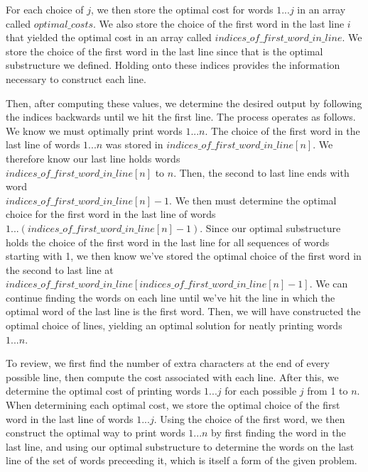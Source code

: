 \documentclass[11pt]{article}
\begin{document}
For each choice of $j$, we then store the optimal cost for words $1...j$ in an array called $optimal\_costs$. We also store the choice of the first word in the last line $i$ that yielded the optimal cost in an array called $indices\_of\_first\_word\_in\_line$. We store the choice of the first word in the last line since that is the optimal substructure we defined. Holding onto these indices provides the information necessary to construct each line.

Then, after computing these values, we determine the desired output by following the indices backwards until we hit the first line. The process operates as follows. We know we must optimally print words $1...n$. The choice of the first word in the last line of words $1...n$ was stored in $indices\_of\_first\_word\_in\_line[n]$. We therefore know our last line holds words\\ $indices\_of\_first\_word\_in\_line[n]$ to $n$. Then, the second to last line ends with word\\ $indices\_of\_first\_word\_in\_line[n] - 1$. We then must determine the optimal choice for the first word in the last line of words $1...(indices\_of\_first\_word\_in\_line[n] - 1)$. Since our optimal substructure holds the choice of the first word in the last line for all sequences of words starting with 1, we then know we've stored the optimal choice of the first word in the second to last line at\\ $indices\_of\_first\_word\_in\_line[indices\_of\_first\_word\_in\_line[n] - 1]$. We can continue finding the words on each line until we've hit the line in which the optimal word of the last line is the first word. Then, we will have constructed the optimal choice of lines, yielding an optimal solution for neatly printing words $1...n$.

To review, we first find the number of extra characters at the end of every possible line, then compute the cost associated with each line. After this, we determine the optimal cost of printing words $1...j$ for each possible $j$ from 1 to $n$. When determining each optimal cost, we store the optimal choice of the first word in the last line of words $1...j$. Using the choice of the first word, we then construct the optimal way to print words $1...n$ by first finding the word in the last line, and using our optimal substructure to determine the words on the last line of the set of words preceeding it, which is itself a form of the given problem.
\end{document}
